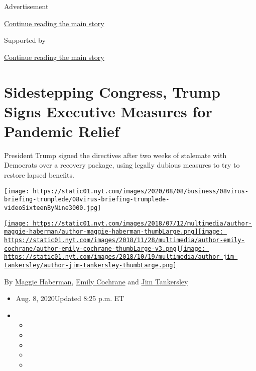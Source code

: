 Advertisement

\protect\hyperlink{after-top}{Continue reading the main story}

Supported by

\protect\hyperlink{after-sponsor}{Continue reading the main story}

\hypertarget{sidestepping-congress-trump-signs-executive-measures-for-pandemic-relief}{%
\section{Sidestepping Congress, Trump Signs Executive Measures for
Pandemic
Relief}\label{sidestepping-congress-trump-signs-executive-measures-for-pandemic-relief}}

President Trump signed the directives after two weeks of stalemate with
Democrats over a recovery package, using legally dubious measures to try
to restore lapsed benefits.

\texttt{[image: https://static01.nyt.com/images/2020/08/08/business/08virus-briefing-trumplede/08virus-briefing-trumplede-videoSixteenByNine3000.jpg]}

\href{https://www.nytimes.com/by/maggie-haberman}{\texttt{[image: https://static01.nyt.com/images/2018/07/12/multimedia/author-maggie-haberman/author-maggie-haberman-thumbLarge.png]}}\href{https://www.nytimes.com/by/emily-cochrane}{\texttt{[image: https://static01.nyt.com/images/2018/11/28/multimedia/author-emily-cochrane/author-emily-cochrane-thumbLarge-v3.png]}}\href{https://www.nytimes.com/by/jim-tankersley}{\texttt{[image: https://static01.nyt.com/images/2018/10/19/multimedia/author-jim-tankersley/author-jim-tankersley-thumbLarge.png]}}

By \href{https://www.nytimes.com/by/maggie-haberman}{Maggie Haberman},
\href{https://www.nytimes.com/by/emily-cochrane}{Emily Cochrane} and
\href{https://www.nytimes.com/by/jim-tankersley}{Jim Tankersley}

\begin{itemize}
\item
  Aug. 8, 2020Updated 8:25 p.m. ET
\item
  \begin{itemize}
  \item
  \item
  \item
  \item
  \item
  \end{itemize}
\end{itemize}

